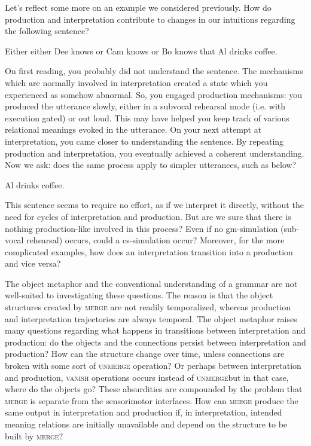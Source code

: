   Let's reflect some more on an example we considered previously. How do production and interpretation contribute to changes in our intuitions regarding the following sentence? 

\ea
Either either Dee knows or Cam knows or Bo knows that Al drinks coffee.
\z

  On first reading, you probably did not understand the sentence. The mechanisms which are normally involved in interpretation created a state which you experienced as somehow abnormal. So, you engaged production mechanisms: you produced the utterance slowly, either in a subvocal rehearsal mode (i.e. with execution gated) or out loud. This may have helped you keep track of various relational meanings evoked in the utterance. On your next attempt at interpretation, you came closer to understanding the sentence. By repeating production and interpretation, you eventually achieved a coherent understanding. Now we ask: does the same process apply to simpler utterances, such as below?

\ea
Al drinks coffee.
\z

  This sentence seems to require no effort, as if we interpret it directly, without the need for cycles of interpretation and production. But are we sure that there is nothing production-like involved in this process? Even if no gm-simulation (sub-vocal rehearsal) occurs, could a cs-simulation occur? Moreover, for the more complicated examples, how does an interpretation transition into a production and vice versa?

  The object metaphor and the conventional understanding of a grammar are not well-suited to investigating these questions. The reason is that the object structures created by \textsc{merge} are not readily temporalized, whereas production and interpretation trajectories are always temporal. The object metaphor raises many questions regarding what happens in transitions between interpretation and production: do the objects and the connections persist between interpretation and production? How can the structure change over time, unless connections are broken with some sort of \textsc{unmerge} operation? Or perhaps between interpretation and production, \textsc{vanish} operations occurs instead of \textsc{unmerge}{\textemdash}but in that case, where do the objects go? These absurdities are compounded by the problem that \textsc{merge} is separate from the sensorimotor interfaces. How can \textsc{merge} produce the same output in interpretation and production if, in interpretation, intended meaning relations are initially unavailable and depend on the structure to be built by \textsc{merge?} 

